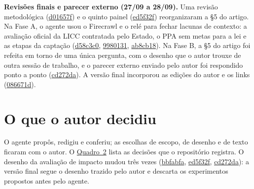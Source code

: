 \documentclass[12pt,a4paper]{article}
\begin{document}
\textbf{Revisões finais e parecer externo (27/09 a 28/09).} Uma revisão metodológica
(\href{https://github.com/fcarva/aval-pol/commit/d01657f1aad092f014f31eef022adfbc177663b3}{d01657f})
e o quinto painel
(\href{https://github.com/fcarva/aval-pol/commit/ed5f32f031c73ec6ddcf5370ab409d4a8cdc759d}{ed5f32f})
reorganizaram a §5 do artigo. Na Fase A, o agente usou o Firecrawl e o relé para fechar lacunas de
contexto: a avaliação oficial da LICC contratada pelo Estado, o PPA sem metas para a lei e as etapas
da captação
(\href{https://github.com/fcarva/aval-pol/commit/d58c3c0f5ac03144cfe050f78494ef461bc41b4c}{d58c3c0},
\href{https://github.com/fcarva/aval-pol/commit/9980131225a51bac25eda2b68934e0082871cdc7}{9980131},
\href{https://github.com/fcarva/aval-pol/commit/ab8cb18811283f36a688c5968953800ed85ac439}{ab8cb18}).
Na Fase B, a §5 do artigo foi refeita em torno de uma única pergunta, com o desenho que o autor
trouxe de outra sessão de trabalho, e o parecer externo enviado pelo autor foi respondido ponto a
ponto
(\href{https://github.com/fcarva/aval-pol/commit/cd272da48a41b341ab8de641374e48514b3f51fa}{cd272da}).
A versão final incorporou as edições do autor e os links
(\href{https://github.com/fcarva/aval-pol/commit/086671d829e2db4a2f4980c87108a6ed5e34bb36}{086671d}).

\section{O que o autor decidiu}\label{secao-5}

O agente propôs, redigiu e conferiu; as escolhas de escopo, de desenho e de texto ficaram com o
autor. O \hyperref[quadro-2]{Quadro~2} lista as decisões que o repositório registra. O desenho da avaliação de impacto
mudou três vezes
(\href{https://github.com/fcarva/aval-pol/commit/bbfabfa037267b4dbd9331f66d9fb15798509eee}{bbfabfa},
\href{https://github.com/fcarva/aval-pol/commit/ed5f32f031c73ec6ddcf5370ab409d4a8cdc759d}{ed5f32f},
\href{https://github.com/fcarva/aval-pol/commit/cd272da48a41b341ab8de641374e48514b3f51fa}{cd272da}):
a versão final segue o desenho trazido pelo autor e descarta os experimentos propostos antes pelo
agente.
\end{document}
